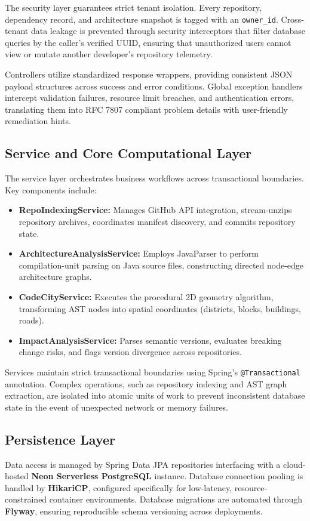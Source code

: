 \documentclass[11pt,a4paper,openany]{report}
\begin{document}
The security layer guarantees strict tenant isolation. Every repository, dependency record, and architecture snapshot is tagged with an \texttt{owner\_id}. Cross-tenant data leakage is prevented through security interceptors that filter database queries by the caller's verified UUID, ensuring that unauthorized users cannot view or mutate another developer's repository telemetry.

Controllers utilize standardized response wrappers, providing consistent JSON payload structures across success and error conditions. Global exception handlers intercept validation failures, resource limit breaches, and authentication errors, translating them into RFC 7807 compliant problem details with user-friendly remediation hints.

\subsection{Service and Core Computational Layer}
The service layer orchestrates business workflows across transactional boundaries. Key components include:
\begin{itemize}[leftmargin=1.2cm]
    \item \textbf{RepoIndexingService:} Manages GitHub API integration, stream-unzips repository archives, coordinates manifest discovery, and commits repository state.
    \item \textbf{ArchitectureAnalysisService:} Employs JavaParser to perform compilation-unit parsing on Java source files, constructing directed node-edge architecture graphs.
    \item \textbf{CodeCityService:} Executes the procedural 2D geometry algorithm, transforming AST nodes into spatial coordinates (districts, blocks, buildings, roads).
    \item \textbf{ImpactAnalysisService:} Parses semantic versions, evaluates breaking change risks, and flags version divergence across repositories.
\end{itemize}

Services maintain strict transactional boundaries using Spring's \texttt{@Transactional} annotation. Complex operations, such as repository indexing and AST graph extraction, are isolated into atomic units of work to prevent inconsistent database state in the event of unexpected network or memory failures.

\subsection{Persistence Layer}
Data access is managed by Spring Data JPA repositories interfacing with a cloud-hosted \textbf{Neon Serverless PostgreSQL} instance. Database connection pooling is handled by \textbf{HikariCP}, configured specifically for low-latency, resource-constrained container environments. Database migrations are automated through \textbf{Flyway}, ensuring reproducible schema versioning across deployments.
\end{document}
